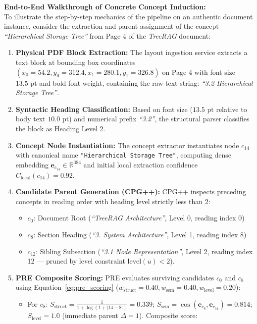 \documentclass[12pt,a4paper]{report}
\begin{document}
\noindent\textbf{End-to-End Walkthrough of Concrete Concept Induction:} \\
To illustrate the step-by-step mechanics of the pipeline on an authentic document instance, consider the extraction and parent assignment of the concept \textit{``Hierarchical Storage Tree''} from Page 4 of the \textit{TreeRAG} document:
\begin{enumerate}
    \item \textbf{Physical PDF Block Extraction:} The layout ingestion service extracts a text block at bounding box coordinates $(x_0=54.2, y_0=312.4, x_1=280.1, y_1=326.8)$ on Page 4 with font size $13.5\text{ pt}$ and bold font weight, containing the raw text string: \textit{``3.2 Hierarchical Storage Tree''}.
    \item \textbf{Syntactic Heading Classification:} Based on font size ($13.5\text{ pt}$ relative to body text $10.0\text{ pt}$) and numerical prefix \textit{``3.2''}, the structural parser classifies the block as Heading Level 2.
    \item \textbf{Concept Node Instantiation:} The concept extractor instantiates node $c_{14}$ with canonical name \texttt{"Hierarchical Storage Tree"}, computing dense embedding $\mathbf{e}_{c_{14}} \in \mathbb{R}^{384}$ and initial local extraction confidence $C_{\text{local}}(c_{14}) = 0.92$.
    \item \textbf{Candidate Parent Generation (CPG++):} CPG++ inspects preceding concepts in reading order with heading level strictly less than 2:
    \begin{itemize}
        \item $c_0$: Document Root (\textit{``TreeRAG Architecture''}, Level 0, reading index 0)
        \item $c_8$: Section Heading (\textit{``3. System Architecture''}, Level 1, reading index 8)
        \item $c_{12}$: Sibling Subsection (\textit{``3.1 Node Representation''}, Level 2, reading index 12 --- pruned by level constraint $\text{level}(u) < 2$).
    \end{itemize}
    \item \textbf{PRE Composite Scoring:} PRE evaluates surviving candidates $c_0$ and $c_8$ using Equation~\eqref{eq:pre_scoring} ($w_{\text{struct}}=0.40, w_{\text{sem}}=0.40, w_{\text{level}}=0.20$):
    \begin{itemize}
        \item For $c_8$: $S_{\text{struct}} = \frac{1}{1 + \log(1 + |14 - 8|)} = 0.339$; $S_{\text{sem}} = \cos(\mathbf{e}_{c_8}, \mathbf{e}_{c_{14}}) = 0.814$; $S_{\text{level}} = 1.0$ (immediate parent $\Delta = 1$). Composite score:

\end{itemize}
\end{enumerate}
\end{document}
